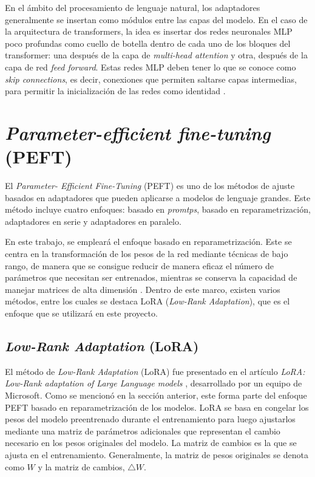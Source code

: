 \documentclass[11pt,spanish,listoffigures,listoftables]{tfgetsinf}
\begin{document}
En el ámbito del procesamiento de lenguaje natural, los adaptadores generalmente se insertan como módulos entre las capas del modelo. En el caso de la arquitectura de transformers, la idea es insertar dos redes neuronales MLP poco profundas como cuello de botella dentro de cada uno de los bloques del transformer: una después de la capa de \textit{multi-head attention} y otra, después de la capa de red \textit{feed forward}. Estas redes MLP deben tener lo que se conoce como \textit{skip connections}, es decir, conexiones que permiten saltarse capas intermedias, para permitir la inicialización de las redes como identidad \cite{murphy2022probabilistic}.

\section{\textit{Parameter-efficient fine-tuning} (PEFT)}

El \textit{Parameter- Efficient Fine-Tuning} (PEFT) es uno de los métodos de ajuste basados en adaptadores que pueden aplicarse a modelos de lenguaje grandes. Este método incluye cuatro enfoques: basado en \textit{promtps}, basado en reparametrización, adaptadores en serie y adaptadores en paralelo.

En este trabajo, se empleará el enfoque basado en reparametrización. Este se centra en la transformación de los pesos de la red mediante técnicas de bajo rango, de manera que se consigue reducir de manera eficaz el número de parámetros que necesitan ser entrenados, mientras se conserva la capacidad de manejar matrices de alta dimensión \cite{hu2023llmadaptersadapterfamilyparameterefficient}. Dentro de este marco, existen varios métodos, entre los cuales se destaca LoRA (\textit{Low-Rank Adaptation}), que es el enfoque que se utilizará en este proyecto.

\subsection{\textit{Low-Rank Adaptation} (LoRA)} \label{lora}

El método de \textit{Low-Rank Adaptation} (LoRA) fue presentado en el artículo \textit{LoRA: Low-Rank adaptation of Large Language models} \cite{hu2021loralowrankadaptationlarge}, desarrollado por un equipo de Microsoft. Como se mencionó en la sección anterior, este forma parte del enfoque PEFT basado en reparametrización de los modelos. LoRA se basa en congelar los pesos del modelo preentrenado durante el entrenamiento para luego ajustarlos mediante una matriz de parámetros adicionales que representan el cambio necesario en los pesos originales del modelo. La matriz de cambios es la que se ajusta en el entrenamiento. Generalmente, la matriz de pesos originales se denota como $W$ y la matriz de cambios, $\bigtriangleup W$.
\end{document}
